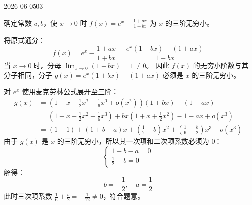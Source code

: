 \begin{mistake}{2026-06-05}{03}

\begin{problemcontent}
确定常数 \(a, b\)，使 \(x \to 0\) 时 \(f(x) = e^x - \frac{1+ax}{1+bx}\) 为 \(x\) 的三阶无穷小。
\end{problemcontent}

\begin{solutioncontent}
将原式通分：
\[
f(x) = e^x - \frac{1+ax}{1+bx} = \frac{e^x(1+bx) - (1+ax)}{1+bx}
\]
当 \(x \to 0\) 时，分母 \(\lim_{x \to 0} (1+bx) = 1 \neq 0\)。
因此 \(f(x)\) 的无穷小阶数与其分子相同，分子 \(g(x) = e^x(1+bx) - (1+ax)\) 必须是 \(x\) 的三阶无穷小。

对 \(e^x\) 使用麦克劳林公式展开至三阶：
\[
\begin{aligned}
g(x) &= \left( 1 + x + \frac{1}{2}x^2 + \frac{1}{6}x^3 + o(x^3) \right)(1+bx) - (1+ax) \\
&= \left( 1 + x + \frac{1}{2}x^2 + \frac{1}{6}x^3 \right) + bx\left( 1 + x + \frac{1}{2}x^2 \right) - 1 - ax + o(x^3) \\
&= (1 - 1) + (1 + b - a)x + \left( \frac{1}{2} + b \right)x^2 + \left( \frac{1}{6} + \frac{b}{2} \right)x^3 + o(x^3)
\end{aligned}
\]
由于 \(g(x)\) 是 \(x\) 的三阶无穷小，所以其一次项和二次项系数必须为 \(0\)：
\[
\begin{cases}
1 + b - a = 0 \\
\frac{1}{2} + b = 0 
\end{cases}
\]
解得：
\[
b = -\frac{1}{2}, \quad a = \frac{1}{2}
\]
此时三次项系数 \(\frac{1}{6} + \frac{b}{2} = -\frac{1}{12} \neq 0\)，符合题意。
\end{solutioncontent}


\end{mistake}

